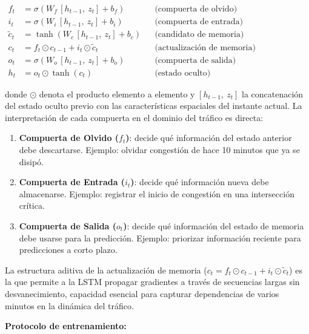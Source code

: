 \documentclass[12pt,a4paper,oneside]{report}
\newenvironment{centeredmath}
  {\begin{center}\begin{adjustbox}{max width=0.96\linewidth}\(\displaystyle}
  {\)\end{adjustbox}\end{center}}
\begin{document}
\begin{centeredmath}
\begin{aligned}
f_{t} &= \sigma\!\left(W_{f}\,[h_{t - 1},\ z_{t}] + b_{f}\right) && \text{(compuerta de olvido)}\\
i_{t} &= \sigma\!\left(W_{i}\,[h_{t - 1},\ z_{t}] + b_{i}\right) && \text{(compuerta de entrada)}\\
\tilde{c}_{t} &= \tanh\!\left(W_{c}\,[h_{t - 1},\ z_{t}] + b_{c}\right) && \text{(candidato de memoria)}\\
c_{t} &= f_{t} \odot c_{t - 1} + i_{t} \odot \tilde{c}_{t} && \text{(actualización de memoria)}\\
o_{t} &= \sigma\!\left(W_{o}\,[h_{t - 1},\ z_{t}] + b_{o}\right) && \text{(compuerta de salida)}\\
h_{t} &= o_{t} \odot \tanh(c_{t}) && \text{(estado oculto)}
\end{aligned}
\end{centeredmath}

donde \(\odot\) denota el producto elemento a elemento y \([h_{t-1},\ z_{t}]\) la concatenación del estado oculto previo con las características espaciales del instante actual. La interpretación de cada compuerta en el dominio del tráfico es directa:

\begin{enumerate}
\def\labelenumi{\arabic{enumi}.}
\item
  \textbf{Compuerta de Olvido (\(f_{t}\))}: decide qué información del estado anterior debe descartarse. Ejemplo: olvidar congestión de hace 10 minutos que ya se disipó.
\item
  \textbf{Compuerta de Entrada (\(i_{t}\))}: decide qué información nueva debe almacenarse. Ejemplo: registrar el inicio de congestión en una intersección crítica.
\item
  \textbf{Compuerta de Salida (\(o_{t}\))}: decide qué información del estado de memoria debe usarse para la predicción. Ejemplo: priorizar información reciente para predicciones a corto plazo.
\end{enumerate}

La estructura aditiva de la actualización de memoria (\(c_{t} = f_{t} \odot c_{t-1} + i_{t} \odot \tilde{c}_{t}\)) es la que permite a la LSTM propagar gradientes a través de secuencias largas sin desvanecimiento, capacidad esencial para capturar dependencias de varios minutos en la dinámica del tráfico.

\textbf{Protocolo de entrenamiento:}
\end{document}
